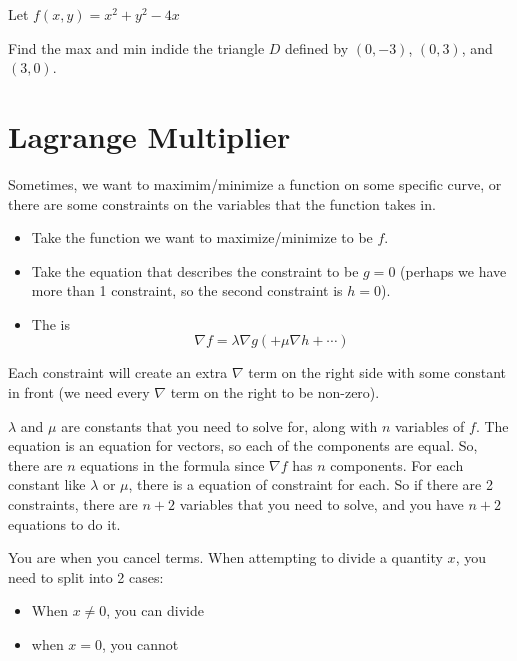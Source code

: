 \documentclass[11pt,fleqn]{book} %
\begin{document}
\begin{exercise}
    Let $f(x,y) = x^2 + y^2 - 4x$

    Find the max and min indide the triangle $D$ defined by $(0, -3)$, $(0, 3)$, and $(3, 0)$. 
\end{exercise}

\section{Lagrange Multiplier}

Sometimes, we want to maximim/minimize a function on some specific curve, or there are some constraints on the variables that the function takes in. 

\begin{itemize}
    \item Take the function we want to maximize/minimize to be $f$.

    \item Take the equation that describes the constraint to be $g = 0$ (perhaps we have more than 1 constraint, so the second constraint is $h = 0$).

    \item The  is $$\nabla f = \lambda \nabla g(+\mu \nabla h + \cdots)$$
\end{itemize}

Each constraint will create an extra $\nabla$ term on the right side with some constant in front (we need every $\nabla$ term on the right to be non-zero). 

$\lambda$ and $\mu$ are constants that you need to solve for, along with $n$ variables of $f$. The equation is an equation for vectors, so each of the components are equal. So, there are $n$ equations in the formula since $\nabla f$ has $n$ components. For each constant like $\lambda$ or $\mu$, there is a equation of constraint for each. So if there are 2 constraints, there are $n + 2$ variables that you need to solve, and you have $n + 2$ equations to do it.

You are  when you cancel terms. When attempting to divide a quantity $x$, you need to split into 2 cases:
\begin{itemize}
    \item When $x \neq 0$, you can divide
    \item when $x = 0$, you cannot
\end{itemize}
\end{document}
